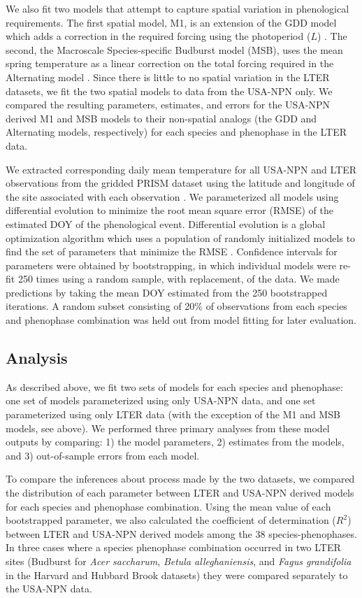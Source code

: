 We also fit two models that attempt to capture spatial variation in phenological requirements. The first spatial model, M1, is an extension of the GDD model which adds a correction in the required forcing using the photoperiod ($L$) \citep{blumel2012}. The second, the Macroscale Species-specific Budburst model (MSB), uses the mean spring temperature as a linear correction on the total forcing required in the Alternating model \citep{jeong2013}. Since there is little to no spatial variation in the LTER datasets, we fit the two spatial models to data from the USA-NPN only. We compared the resulting parameters, estimates, and errors for the USA-NPN derived M1 and MSB models to their non-spatial analogs (the GDD and Alternating models, respectively) for each species and phenophase in the LTER data.  

We extracted corresponding daily mean temperature for all USA-NPN and LTER observations from the gridded PRISM dataset using the latitude and longitude of the site associated with each observation \citep{prismdata}. We parameterized all models using differential evolution to minimize the root mean square error (RMSE) of the estimated DOY of the phenological event. Differential evolution is a global optimization algorithm which uses a population of randomly initialized models to find the set of parameters that minimize the RMSE \citep{storn1997}. Confidence intervals for parameters were obtained by bootstrapping, in which individual models were re-fit 250 times using a random sample, with replacement, of the data. We made predictions by taking the mean DOY estimated from the 250 bootstrapped iterations. A random subset consisting of 20\% of observations from each species and phenophase combination was held out from model fitting for later evaluation.

\subsection{Analysis}

As described above, we fit two sets of models for each species and phenophase: one set of models parameterized using only USA-NPN data, and one set parameterized using only LTER data (with the exception of the M1 and MSB models, see above). We performed three primary analyses from these model outputs by comparing: 1) the model parameters, 2) estimates from the models, and 3) out-of-sample errors from each model.

To compare the inferences about process made by the two datasets, we compared the distribution of each parameter between LTER and USA-NPN derived models for each species and phenophase combination. Using the mean value of each bootstrapped parameter, we also calculated the coefficient of determination ($R^2$) between LTER and USA-NPN derived models among the 38 species-phenophases. In three cases where a species phenophase combination occurred in two LTER sites (Budburst for \textit{Acer saccharum}, \textit{Betula alleghaniensis}, and \textit{Fagus grandifolia} in the Harvard and Hubbard Brook datasets) they were compared separately to the USA-NPN data.

